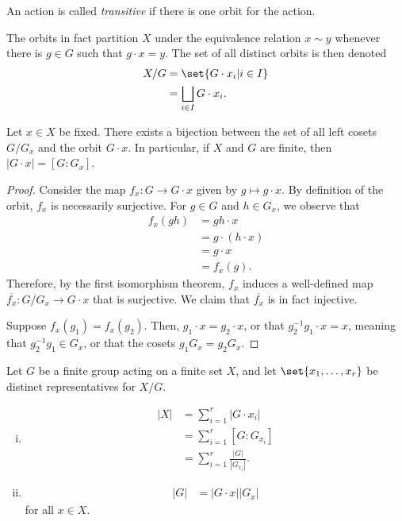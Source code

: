 \documentclass[10pt]{mypackage}
\begin{document}
\begin{definition}
  An action is called \textit{transitive} if there is one orbit for the action.
\end{definition}
The orbits in fact partition $X$ under the equivalence relation $x\sim y$ whenever there is $g\in G$ such that $g\cdot x = y$. The set of all distinct orbits is then denoted
\begin{align*}
  X/G &= \set{G\cdot x_i | i\in I}\\
      &= \bigsqcup_{i\in I} G\cdot x_i.
\end{align*}
\begin{lemma}
  Let $x\in X$ be fixed. There exists a bijection between the set of all left cosets $G/G_x$ and the orbit $G\cdot x$. In particular, if $X$ and $G$ are finite, then $\left\vert G\cdot x \right\vert = \left[ G:G_x \right]$.
\end{lemma}
\begin{proof}
  Consider the map $f_x\colon G\rightarrow G\cdot x$ given by $g\mapsto g\cdot x$. By definition of the orbit, $f_x$ is necessarily surjective. For $g\in G$ and $h\in G_x$, we observe that
  \begin{align*}
    f_x\left( gh \right) &= gh\cdot x\\
                         &= g\cdot \left( h\cdot x \right)\\
                         &= g\cdot x\\
                         &= f_x\left( g \right).
  \end{align*}
  Therefore, by the first isomorphism theorem, $f_x$ induces a well-defined map $ \overline{f_x}\colon G/G_x\rightarrow G\cdot x $ that is surjective. We claim that $ \overline{f_x} $ is in fact injective.%

  Suppose $f_x\left( g_1 \right) = f_x\left( g_2 \right)$. Then, $g_1\cdot x = g_2\cdot x$, or that $g_2^{-1}g_1\cdot x = x$, meaning that $g_2^{-1}g_1\in G_x$, or that the cosets $g_1G_x = g_2G_x$.
\end{proof}
\begin{corollary}\hfill
  Let $G$ be a finite group acting on a finite set $X$, and let $\set{x_1,\dots,x_r}$ be distinct representatives for $X/G$.
  \begin{enumerate}[(i)]
    \item 
      \begin{align*}
        \left\vert X \right\vert &= \sum_{i=1}^{r} \left\vert G\cdot x_i \right\vert\\
                                 &= \sum_{i=1}^{r} \left[ G:G_{x_i} \right]\\
                                 &= \sum_{i=1}^{r} \frac{\left\vert G \right\vert}{\left\vert G_{x_i} \right\vert}.
      \end{align*}
    \item 
      \begin{align*}
        \left\vert G \right\vert &= \left\vert G\cdot x \right\vert \left\vert G_{x} \right\vert
      \end{align*}
      for all $x\in X$.
  \end{enumerate}
\end{corollary}
\end{document}
